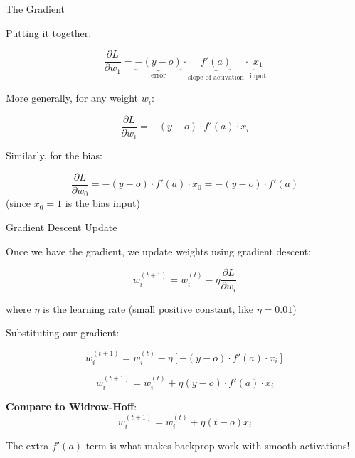 \documentclass[aspectratio=169]{beamer}\usepackage[]{graphicx}\usepackage[]{xcolor}
\begin{document}
\begin{frame}{The Gradient}

Putting it together:

\vfill

\[
\frac{\partial L}{\partial w_1} = \underbrace{-(y - o)}_{\text{error}} \cdot \underbrace{f'(a)}_{\text{slope of activation}} \cdot \underbrace{x_1}_{\text{input}}
\]

\vfill

More generally, for any weight $w_i$:

\[
\frac{\partial L}{\partial w_i} = -(y - o) \cdot f'(a) \cdot x_i
\]

\vfill

Similarly, for the bias:

\[
\frac{\partial L}{\partial w_0} = -(y - o) \cdot f'(a) \cdot x_0 = -(y - o) \cdot f'(a)
\]
(since $x_0 = 1$ is the bias input)

\end{frame}

\begin{frame}{Gradient Descent Update}

Once we have the gradient, we update weights using gradient descent:

\vfill

\[
w_i^{(t+1)} = w_i^{(t)} - \eta \frac{\partial L}{\partial w_i}
\]

where $\eta$ is the learning rate (small positive constant, like $\eta = 0.01$)

\vfill

Substituting our gradient:

\[
w_i^{(t+1)} = w_i^{(t)} - \eta \left[-(y - o) \cdot f'(a) \cdot x_i\right]
\]

\[
w_i^{(t+1)} = w_i^{(t)} + \eta (y - o) \cdot f'(a) \cdot x_i
\]

\vfill

\textbf{Compare to Widrow-Hoff}:
\[
w_i^{(t+1)} = w_i^{(t)} + \eta (t - o) x_i
\]

The extra $f'(a)$ term is what makes backprop work with smooth activations!

\end{frame}
\end{document}
